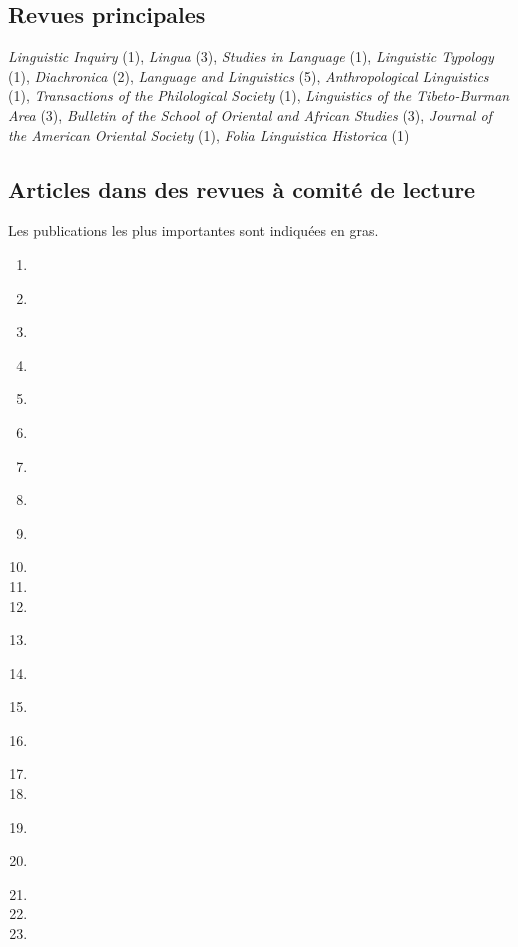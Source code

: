 \documentclass[oldfontcommands,oneside,a4paper,11pt]{article}
\begin{document}
    \subsection*{Revues principales}
    \textit{Linguistic Inquiry} (1), \textit{Lingua} (3), \textit{Studies in Language} (1), \textit{Linguistic Typology} (1), \textit{Diachronica} (2), \textit{Language and Linguistics} (5), \textit{Anthropological Linguistics} (1), \textit{Transactions of the Philological Society} (1), \textit{Linguistics of the Tibeto-Burman Area} (3), \textit{Bulletin of the School of Oriental and African Studies} (3), \textit{Journal of the American Oriental Society} (1), \textit{Folia Linguistica Historica} (1)
    \subsection*{Articles dans des revues à comité de lecture}
    Les  publications les plus importantes sont indiquées en gras.
      \begin{enumerate}
\item \textbf{}
\item \textbf{}
\item \textbf{}
\item {}  
\item \textbf{}
\item  {}
\item \textbf{}
   \item   {}   
\item\textbf{ }
\item {}  
\item {}  
  \item  {}
\item  \textbf{}
 \item  \textbf{}
\item {} 
\item \textbf{ }
\item {} 
\item {} 
\item \textbf{} 
\item \textbf{}
\item {}
 \item   {}   
 \item  {}
 
 
  \end{enumerate}
\end{document}
